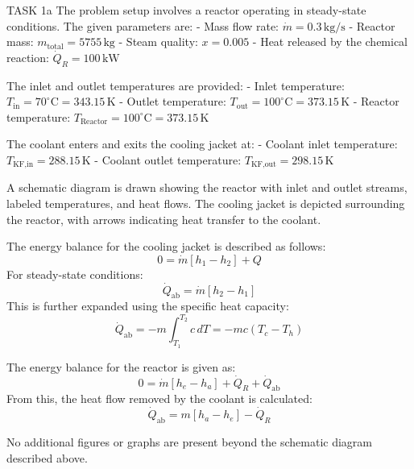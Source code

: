 TASK 1a  
The problem setup involves a reactor operating in steady-state conditions. The given parameters are:  
- Mass flow rate: \( \dot{m} = 0.3 \, \text{kg/s} \)  
- Reactor mass: \( m_{\text{total}} = 5755 \, \text{kg} \)  
- Steam quality: \( x = 0.005 \)  
- Heat released by the chemical reaction: \( \dot{Q}_R = 100 \, \text{kW} \)  

The inlet and outlet temperatures are provided:  
- Inlet temperature: \( T_{\text{in}} = 70^\circ\text{C} = 343.15 \, \text{K} \)  
- Outlet temperature: \( T_{\text{out}} = 100^\circ\text{C} = 373.15 \, \text{K} \)  
- Reactor temperature: \( T_{\text{Reactor}} = 100^\circ\text{C} = 373.15 \, \text{K} \)  

The coolant enters and exits the cooling jacket at:  
- Coolant inlet temperature: \( T_{\text{KF,in}} = 288.15 \, \text{K} \)  
- Coolant outlet temperature: \( T_{\text{KF,out}} = 298.15 \, \text{K} \)  

A schematic diagram is drawn showing the reactor with inlet and outlet streams, labeled temperatures, and heat flows. The cooling jacket is depicted surrounding the reactor, with arrows indicating heat transfer to the coolant.  

The energy balance for the cooling jacket is described as follows:  
\[
0 = \dot{m} \left[ h_1 - h_2 \right] + Q
\]  
For steady-state conditions:  
\[
\dot{Q}_{\text{ab}} = \dot{m} \left[ h_2 - h_1 \right]
\]  
This is further expanded using the specific heat capacity:  
\[
\dot{Q}_{\text{ab}} = -m \int_{T_1}^{T_2} c \, dT = -m c \left( T_c - T_h \right)
\]  

The energy balance for the reactor is given as:  
\[
0 = \dot{m} \left[ h_e - h_a \right] + \dot{Q}_R + \dot{Q}_{\text{ab}}
\]  
From this, the heat flow removed by the coolant is calculated:  
\[
\dot{Q}_{\text{ab}} = m \left[ h_a - h_e \right] - \dot{Q}_R
\]  

No additional figures or graphs are present beyond the schematic diagram described above.